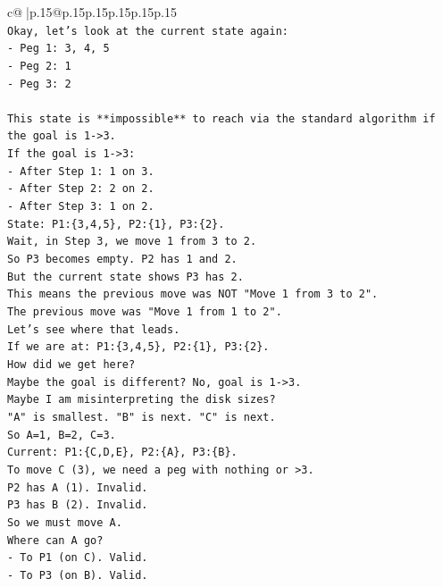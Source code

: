 \documentclass{article}
\begin{document}
{\begin{supertabular}{c@{$\;$}|p{.15\linewidth}@{}p{.15\linewidth}p{.15\linewidth}p{.15\linewidth}p{.15\linewidth}p{.15\linewidth}}
{{{\\ 
\texttt{Okay, let's look at the current state again:} \\
\texttt{{-} Peg 1: 3, 4, 5} \\
\texttt{{-} Peg 2: 1} \\
\texttt{{-} Peg 3: 2} \\
\\ 
\texttt{This state is **impossible** to reach via the standard algorithm if the goal is 1{-}>3.} \\
\texttt{If the goal is 1{-}>3:} \\
\texttt{{-} After Step 1: 1 on 3.} \\
\texttt{{-} After Step 2: 2 on 2.} \\
\texttt{{-} After Step 3: 1 on 2.} \\
\texttt{State: P1:\{3,4,5\}, P2:\{1\}, P3:\{2\}.} \\
\texttt{Wait, in Step 3, we move 1 from 3 to 2.} \\
\texttt{So P3 becomes empty. P2 has 1 and 2.} \\
\texttt{But the current state shows P3 has 2.} \\
\texttt{This means the previous move was NOT "Move 1 from 3 to 2".} \\
\texttt{The previous move was "Move 1 from 1 to 2".} \\
\texttt{Let's see where that leads.} \\
\texttt{If we are at: P1:\{3,4,5\}, P2:\{1\}, P3:\{2\}.} \\
\texttt{How did we get here?} \\
\texttt{Maybe the goal is different? No, goal is 1{-}>3.} \\
\texttt{Maybe I am misinterpreting the disk sizes?} \\
\texttt{"A" is smallest. "B" is next. "C" is next.} \\
\texttt{So A=1, B=2, C=3.} \\
\texttt{Current: P1:\{C,D,E\}, P2:\{A\}, P3:\{B\}.} \\
\texttt{To move C (3), we need a peg with nothing or >3.} \\
\texttt{P2 has A (1). Invalid.} \\
\texttt{P3 has B (2). Invalid.} \\
\texttt{So we must move A.} \\
\texttt{Where can A go?} \\
\texttt{{-} To P1 (on C). Valid.} \\
\texttt{{-} To P3 (on B). Valid.} \\
}}}
\end{supertabular}}
\end{document}
